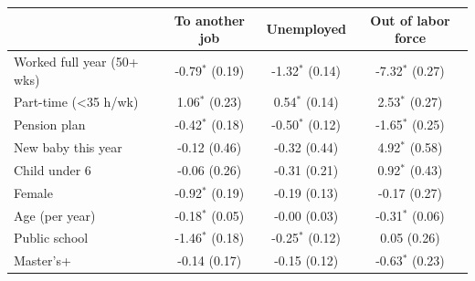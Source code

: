\begin{tabular}{lccc}
\toprule
 & To another job & Unemployed & Out of labor force \\
\midrule
Worked full year (50+ wks) & -0.79$^{*}$ (0.19) & -1.32$^{*}$ (0.14) & -7.32$^{*}$ (0.27) \\
Part-time (<35 h/wk) & 1.06$^{*}$ (0.23) & 0.54$^{*}$ (0.14) & 2.53$^{*}$ (0.27) \\
Pension plan & -0.42$^{*}$ (0.18) & -0.50$^{*}$ (0.12) & -1.65$^{*}$ (0.25) \\
New baby this year & -0.12 (0.46) & -0.32 (0.44) & 4.92$^{*}$ (0.58) \\
Child under 6 & -0.06 (0.26) & -0.31 (0.21) & 0.92$^{*}$ (0.43) \\
Female & -0.92$^{*}$ (0.19) & -0.19 (0.13) & -0.17 (0.27) \\
Age (per year) & -0.18$^{*}$ (0.05) & -0.00 (0.03) & -0.31$^{*}$ (0.06) \\
Public school & -1.46$^{*}$ (0.18) & -0.25$^{*}$ (0.12) & 0.05 (0.26) \\
Master's+ & -0.14 (0.17) & -0.15 (0.12) & -0.63$^{*}$ (0.23) \\
\bottomrule
\end{tabular}
